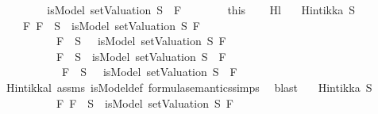 \begin{isabellebody}
\ \ \ \ \isamarkupfalse%
\ \isamarkupfalse%
\ {\isachardoublequoteopen}{\isasymnot}\ isModel\ {\isacharparenleft}setValuation\ S{\isacharparenright}\ {\isacharparenleft}\isactrlbold {\isasymnot}\ F{\isacharparenright}{\isachardoublequoteclose}\isanewline
\ \ \ \ \ \ \isamarkupfalse%
\ this\isanewline
\ \ \isamarkupfalse%
\isanewline
{}\isamarkupfalse%
%
\endisatagproof
{\isafoldproof}%
%
\isadelimproof
\isanewline
%
\endisadelimproof
\isanewline
{}\isamarkupfalse%
\ Hl{}{\isacharunderscore}{}{\isacharcolon}\isanewline
\ \ \ {\isachardoublequoteopen}Hintikka\ S{\isachardoublequoteclose}\isanewline
\ \ \ {\isachardoublequoteopen}\ {\isasymAnd}F{\isachardot}\ {\isacharparenleft}F\ {\isasymin}\ S\ {\isasymlongrightarrow}\ isModel\ {\isacharparenleft}setValuation\ S{\isacharparenright}\ F{\isacharparenright}\ {\isasymand}\isanewline
\ \ \ \ \ \ \ \ \ {\isacharparenleft}\isactrlbold {\isasymnot}\ F\ {\isasymin}\ S\ {\isasymlongrightarrow}\ {\isasymnot}\ isModel\ {\isacharparenleft}setValuation\ S{\isacharparenright}\ F{\isacharparenright}\ {\isasymLongrightarrow}\isanewline
\ \ \ \ \ \ \ \ \ {\isacharparenleft}\isactrlbold {\isasymnot}\ F\ {\isasymin}\ S\ {\isasymlongrightarrow}\ isModel\ {\isacharparenleft}setValuation\ S{\isacharparenright}\ {\isacharparenleft}\isactrlbold {\isasymnot}\ F{\isacharparenright}{\isacharparenright}\ {\isasymand}\isanewline
\ \ \ \ \ \ \ \ \ {\isacharparenleft}\isactrlbold {\isasymnot}\ {\isacharparenleft}\isactrlbold {\isasymnot}\ F{\isacharparenright}\ {\isasymin}\ S\ {\isasymlongrightarrow}\ {\isasymnot}\ isModel\ {\isacharparenleft}setValuation\ S{\isacharparenright}\ {\isacharparenleft}\isactrlbold {\isasymnot}\ F{\isacharparenright}{\isacharparenright}{\isachardoublequoteclose}\isanewline
%
\isadelimproof
\ \ %
\endisadelimproof
%
\isatagproof
{}\isamarkupfalse%
\ Hintikka{\isacharunderscore}l{}\ assms\ isModel{\isacharunderscore}def\ formula{\isacharunderscore}semantics{\isachardot}simps{\isacharparenleft}{}{\isacharparenright}\ \isamarkupfalse%
\ blast%
\endisatagproof
{\isafoldproof}%
%
\isadelimproof
\isanewline
%
\endisadelimproof
\isanewline
{}\isamarkupfalse%
\isanewline
\ \ \ {\isachardoublequoteopen}Hintikka\ S{\isachardoublequoteclose}\isanewline
\ \ \ \ \ \ \ \ \ \ {\isachardoublequoteopen}{\isasymAnd}F{}{\isachardot}\ {\isacharparenleft}F{}\ {\isasymin}\ S\ {\isasymlongrightarrow}\ isModel\ {\isacharparenleft}setValuation\ S{\isacharparenright}\ F{}{\isacharparenright}\ {\isasymand}\isanewline

\end{isabellebody}
